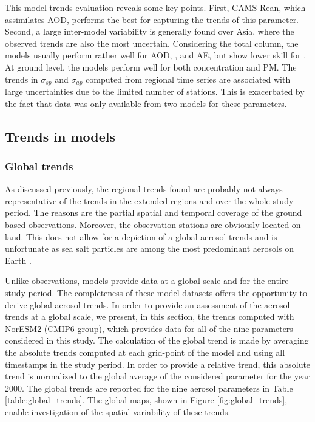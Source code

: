 \documentclass[acp, manuscript]{copernicus}
\begin{document}
This model trends evaluation reveals some key points. First, CAMS-Rean, which assimilates AOD, performs the best for capturing the trends of this parameter. Second, a large inter-model variability is generally found over Asia, where the observed trends are also the most uncertain.
Considering the total column, the models usually perform rather well for AOD, , and AE, but show lower skill for . At ground level, the models perform well for both  concentration and PM. The trends in $\sigma_{sp}$ and $\sigma_{ap}$ computed from regional time series are associated with large uncertainties due to the limited number of stations. This is exacerbated by the fact that data was only available from two models for these parameters.


\subsection{Trends in models}\label{global_trends}

\subsubsection{Global trends}

As discussed previously, the regional trends found are probably not always representative of the trends in the extended regions and over the whole study period. The reasons are the partial spatial and temporal coverage of the ground based observations. Moreover, the observation stations are obviously located on land. This does not allow for a depiction of a global aerosol trends and is unfortunate as sea salt particles are among the most predominant aerosols on Earth \citep{schulz2004sea}.

Unlike observations, models provide data at a global scale and for the entire study period. The completeness of these model datasets offers the opportunity to derive global aerosol trends. In order to provide an assessment of the aerosol trends at a global scale, we present, in this section, the trends computed with NorESM2 (CMIP6 group), which provides data for all of the nine parameters considered in this study. The calculation of the global trend is made by averaging the absolute trends computed at each grid-point of the model and using all timestamps in the study period. In order to provide a relative trend, this absolute trend is normalized to the global average of the considered parameter for the year 2000. The global trends are reported for the nine aerosol parameters in Table \ref{table:global_trends}. The global maps, shown in Figure \ref{fig:global_trends}, enable investigation of the spatial variability of these trends.
\end{document}
